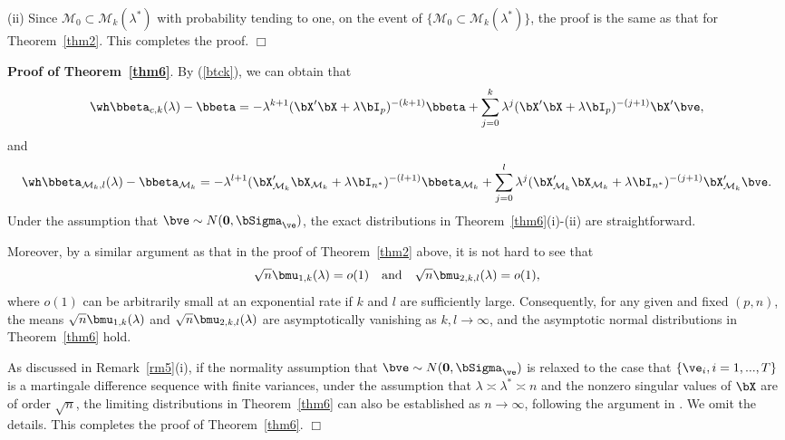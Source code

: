 {{(ii) Since $\mathcal{M}_0\subset\mathcal{M}_k(\lambda^*)$ with probability tending to one, on the event of  $\{\mathcal{M}_0\subset\mathcal{M}_k(\lambda^*)\}$, the proof is the same as that for Theorem~\ref{thm2}. This completes the proof. $\Box$

\vskip 0.6cm
{\bf Proof of Theorem~\ref{thm6}}. By (\ref{btck}), we can obtain that
\[ \wh\bbeta_{c,k}(\lambda)-\bbeta=-\lambda^{k+1}(\bX'\bX+\lambda\bI_p)^{-(k+1)}\bbeta+\sum_{j=0}^k\lambda^j(\bX'\bX+\lambda\bI_p)^{-(j+1)}\bX'\bve,\]
and
\[ \wh\bbeta_{\mathcal{M}_k,l}(\lambda)-\bbeta_{\mathcal{M}_k}=-\lambda^{l+1}(\bX_{\mathcal{M}_k}'\bX_{\mathcal{M}_k}+\lambda\bI_{n^*})^{-(l+1)}\bbeta_{\mathcal{M}_k}+\sum_{j=0}^l\lambda^j(\bX_{\mathcal{M}_k}'\bX_{\mathcal{M}_k}+\lambda\bI_{n^*})^{-(j+1)}\bX_{\mathcal{M}_k}'\bve.\]
Under the assumption that $\bve\sim N({\bf 0},\bSigma_\ve)$, the exact distributions in Theorem~\ref{thm6}(i)-(ii) are straightforward. 

Moreover, by a similar argument as that in the proof of Theorem~\ref{thm2} above, it is not hard to see that
\[\sqrt{n}\bmu_{1,k}(\lambda)=o(1)\quad\text{and}\quad \sqrt{n}\bmu_{2,k,l}(\lambda)=o(1),\]
where $o(1)$ can be arbitrarily small at an exponential rate if $k$ and $l$ are sufficiently large. Consequently, for any given and fixed $(p,n)$, the means $\sqrt{n}\bmu_{1,k}(\lambda)$ and $\sqrt{n}\bmu_{2,k,l}(\lambda)$ are asymptotically vanishing as $k,l\rightarrow\infty$, and the asymptotic normal distributions in Theorem~\ref{thm6} hold. 

As discussed in Remark~\ref{rm5}(i), if the normality assumption that $\bve\sim N({\bf 0},\bSigma_\ve)$ is  relaxed to the case that $\{\ve_i,i=1,...,T\}$ is a martingale difference sequence with finite variances, under the assumption that $\lambda\asymp\lambda^*\asymp n$ and the nonzero singular values of $\bX$ are of order $\sqrt{n}$,  the limiting distributions in Theorem~\ref{thm6} can also be established as $n\rightarrow\infty$, following the argument in \cite{hall2014martingale}. We omit the details. This completes the proof of Theorem~\ref{thm6}. $\Box$

}}
